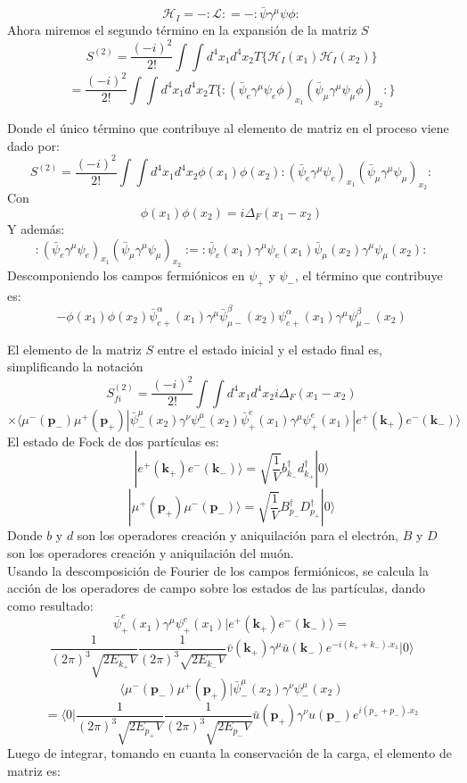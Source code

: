 \begin{equation}
  \mathcal{H}_I=-:\mathcal{L}:
=-:\bar{\psi}\gamma^{\mu}\psi\phi:
\end{equation}
Ahora miremos el segundo término en la expansión de la matriz $S$
\[
 S^{(2)}=\frac{(-i)^2}{2!}\int \int d^4x_1 d^4x_2 T\{\mathcal{H}_I(x_1)\mathcal{H}_I(x_2)\}
\]
\[
 = \frac{(-i)^2}{2!}\int \int d^4x_1 d^4x_2 T\{:(\bar{\psi}_e\gamma^{\mu}\psi_e\phi)_{x_1}(\bar{\psi}_{\mu}\gamma^{\mu}\psi_{\mu}\phi)_{x_2}:\}
\]

Donde el único término que contribuye al elemento de matriz en el proceso viene dado por:
\[
 S^{(2)}=\frac{(-i)^2}{2!} \int \int d^4x_1 d^4x_2 \phi(x_1)\phi(x_2):(\bar{\psi}_e\gamma^{\mu}\psi_e)_{x_1}(\bar{\psi}_{\mu}\gamma^{\mu}\psi_{\mu})_{x_2}:
\]
Con 
\[
 \phi(x_1)\phi(x_2)=i\Delta_F (x_1-x_2)
\]
Y además:
\[
:(\bar{\psi}_e\gamma^{\mu}\psi_e)_{x_1}(\bar{\psi}_{\mu}\gamma^{\mu}\psi_{\mu})_{x_2}:=:\bar{\psi}_e(x_1)\gamma^{\mu}\psi_e(x_1)\bar{\psi}_{\mu}(x_2)\gamma^{\mu}\psi_{\mu}(x_2):
\]
Descomponiendo los campos fermiónicos en $\psi_+$ y $\psi_-$, el término que contribuye es:
\[
 -\phi(x_1)\phi(x_2)\bar{\psi}^{\alpha}_{e+}(x_1)\gamma^{\mu}\bar{\psi}^{\beta}_{\mu-}(x_2)\psi^{\alpha}_{e+}(x_1)\gamma^{\mu}\psi^{\beta}_{\mu-}(x_2)
\]
  

El elemento de la matriz $S$ entre el estado inicial y el estado final es, simplificando la notación
\[
 S^{(2)}_{fi}=\frac{(-i)^2}{2!} \int \int d^4x_1 d^4x_2 i\Delta_F (x_1-x_2)
\]
\[
\times \langle \mu^{-}(\mathbf{p}_{-})\mu^{+}(\mathbf{p}_{+})|\bar{\psi}^{\mu}_{-}(x_2)\gamma^{\nu}{\psi}^{\mu}_{-}(x_2)\bar{\psi}^{e}_{+}(x_1)\gamma^{\mu}\psi^{e}_{+}(x_1)|e^{+}(\mathbf{k}_{+})e^{-}(\mathbf{k}_{-}) \rangle
\]
El estado de Fock de dos partículas es: 
\begin{equation}
 |e^{+}(\mathbf{k}_{+})e^{-}(\mathbf{k}_{-})\rangle=\sqrt{\frac{1}{V}}b_{k_{-}}^{\dagger}d_{k_{+}}^{\dagger}|0\rangle
\end{equation}
\begin{equation}
 |\mu^{+}(\mathbf{p}_{+})\mu^{-}(\mathbf{p}_{-})\rangle=\sqrt{\frac{1}{V}}B_{p_{-}}^{\dagger}D_{p_{+}}^{\dagger}|0\rangle
\end{equation}
Donde $b$ y $d$ son los operadores creación y aniquilación para el electrón, $B$ y $D$ son los operadores creación y aniquilación
del muón.\\
Usando la descomposición de Fourier de los campos fermiónicos, se calcula la acción de los operadores de campo sobre los estados
de las partículas, dando como resultado:
\[
 \bar{\psi}^{e}_{+}(x_1)\gamma^{\mu}\psi^{e}_{+}(x_1)|e^{+}(\mathbf{k}_{+})e^{-}(\mathbf{k}_{-}) \rangle=
\]
\[
\frac{1}{(2\pi)^3\sqrt{2E_{k_{+}} V}}\frac{1}{(2\pi)^3\sqrt{2E_{k_{-}} V}}\bar{v}(\mathbf{k_{+}})\gamma^{\mu}\bar{u}(\mathbf{k_{-}})e^{-i(k_{+}+k_{-}).x_1}|0\rangle
\]
\[
\langle \mu^{-}(\mathbf{p}_{-})\mu^{+}(\mathbf{p}_{+})|\bar{\psi}^{\mu}_{-}(x_2)\gamma^{\nu}{\psi}^{\mu}_{-}(x_2)
\]
\[
=\langle 0|\frac{1}{(2\pi)^3\sqrt{2E_{p_{+}} V}}\frac{1}{(2\pi)^3\sqrt{2E_{p_{-}} V}}\bar{u}(\mathbf{p_{+}})\gamma^{\nu}{u}(\mathbf{p_{-}})e^{i(p_{+}+p_{-}).x_2}
\]
Luego de integrar, tomando en cuanta la conservación de la carga, el elemento de matriz es: 


